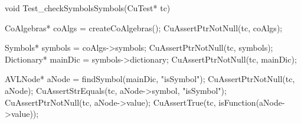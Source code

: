 void Test_checkSymbolsSymbols(CuTest* tc) {
  CoAlgebras* coAlgs = createCoAlgebras();
  CuAssertPtrNotNull(tc, coAlgs);

  Symbols* symbols = coAlgs->symbols;
  CuAssertPtrNotNull(tc, symbols);
  Dictionary* mainDic = symbols->dictionary;
  CuAssertPtrNotNull(tc, mainDic);

  AVLNode* aNode = findSymbol(mainDic, "isSymbol");
  CuAssertPtrNotNull(tc, aNode);
  CuAssertStrEquals(tc, aNode->symbol, "isSymbol");
  CuAssertPtrNotNull(tc, aNode->value);
  CuAssertTrue(tc, isFunction(aNode->value));
}
\stoptyping